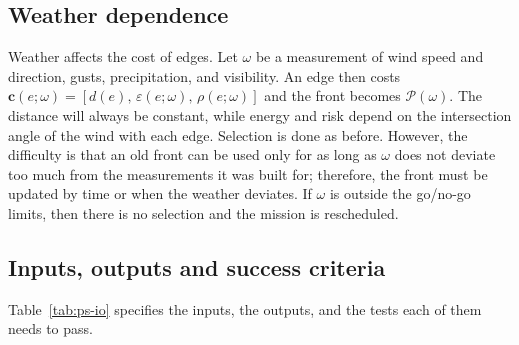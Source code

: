 \subsection{Weather dependence}

Weather affects the cost of edges. Let $\omega$ be a measurement of wind speed and
direction, gusts, precipitation, and visibility. An edge then costs
$\mathbf{c}(e;\omega) = [d(e),\, \varepsilon(e;\omega),\, \rho(e;\omega)]$ and the
front becomes $\mathcal{P}(\omega)$. The distance will always be constant, while energy
and risk depend on the intersection angle of the wind with each edge. Selection is done
as before. However, the difficulty is that an old front can be used only for as long as
$\omega$ does not deviate too much from the measurements it was built for; therefore,
the front must be updated by time or when the weather deviates. If $\omega$ is outside
the go/no-go limits, then there is no selection and the mission is rescheduled.

\subsection{Inputs, outputs and success criteria}

Table~\ref{tab:ps-io} specifies the inputs, the outputs, and the tests each of them
needs to pass.

